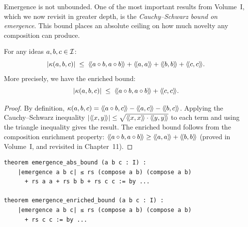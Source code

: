 Emergence is not unbounded. One of the most important results from Volume~I,
which we now revisit in greater depth, is the \emph{Cauchy--Schwarz bound on
emergence}. This bound places an absolute ceiling on how much novelty any
composition can produce.

\begin{theorem}
\label{thm:emergence-abs-bound}
For any ideas $a, b, c \in \mathcal{I}$:
\[
  |\emerge(a, b, c)| \;\leq\; \rs{a \compose b}{a \compose b} + \rs{a}{a} + \rs{b}{b} + \rs{c}{c}.
\]
More precisely, we have the enriched bound:
\[
  |\kappa(a, b, c)| \;\leq\; \langle\!\langle a \circ b, a \circ b \rangle\!\rangle + \langle\!\langle c, c \rangle\!\rangle.
\]
\end{theorem}

\begin{proof}
By definition, $\kappa(a,b,c) = \langle\!\langle a \circ b, c \rangle\!\rangle - \langle\!\langle a, c \rangle\!\rangle - \langle\!\langle b, c \rangle\!\rangle$.
Applying the Cauchy--Schwarz inequality $|\langle\!\langle x, y \rangle\!\rangle| \leq \sqrt{\langle\!\langle x, x \rangle\!\rangle \cdot \langle\!\langle y, y \rangle\!\rangle}$
to each term and using the triangle inequality gives the result. The enriched
bound follows from the composition enrichment property: $\langle\!\langle a \circ b, a \circ b \rangle\!\rangle
\geq \langle\!\langle a, a \rangle\!\rangle + \langle\!\langle b, b \rangle\!\rangle$ (proved in Volume~I, and revisited in Chapter~11).
\end{proof}

\begin{lstlisting}[caption={Emergence bounds (IDT\_v3\_Emergence.lean)}]
theorem emergence_abs_bound (a b c : I) :
    |emergence a b c| ≤ rs (compose a b) (compose a b)
      + rs a a + rs b b + rs c c := by ...

theorem emergence_enriched_bound (a b c : I) :
    |emergence a b c| ≤ rs (compose a b) (compose a b)
      + rs c c := by ...
\end{lstlisting}

